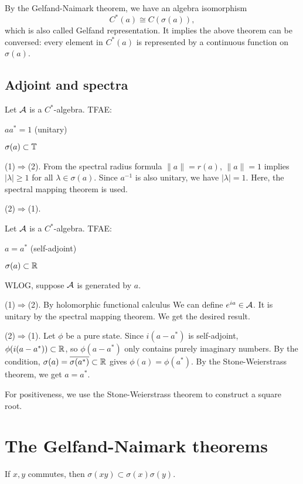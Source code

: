 \documentclass{../crs}
\begin{document}
By the Gelfand-Naimark theorem, we have an algebra isomorphism
\[C^*(a)\cong C(\sigma(a)),\]
which is also called Gelfand representation.
It implies the above theorem can be conversed: every element in $C^*(a)$ is represented by a continuous function on $\sigma(a)$.




\subsection{Adjoint and spectra}
\begin{thm}
Let $\mathcal{A}$ is a $C^*$-algebra.
TFAE:
\begin{cond}
\item $aa^*=1$ (unitary)
\item $\sigma(a)\subset\mathbb{T}$
\end{cond}
\end{thm}
\begin{pf}
(1)$\Rightarrow$(2).
From the spectral radius formula $\|a\|=r(a)$, $\|a\|=1$ implies $|\lambda|\ge1$ for all $\lambda\in\sigma(a)$.
Since $a^{-1}$ is also unitary, we have $|\lambda|=1$.
Here, the spectral mapping theorem is used.

(2)$\Rightarrow$(1).
\end{pf}

\begin{thm}
Let $\mathcal{A}$ is a $C^*$-algebra.
TFAE:
\begin{cond}
\item $a=a^*$ (self-adjoint)
\item $\sigma(a)\subset\mathbb{R}$
\end{cond}
\end{thm}
\begin{pf}
WLOG, suppose $\mathcal{A}$ is generated by $a$.

(1)$\Rightarrow$(2).
By holomorphic functional calculus We can define $e^{ia}\in\mathcal{A}$.
It is unitary by the spectral mapping theorem.
We get the desired result.

(2)$\Rightarrow$(1).
Let $\phi$ be a pure state.
Since $i(a-a^*)$ is self-adjoint, $\phi(i(a-a^*))\subset\mathbb{R}$, so $\phi(a-a^*)$ only contains purely imaginary numbers.
By the condition, $\sigma(a)=\overline{\sigma(a^*)}\subset\mathbb{R}$ gives $\phi(a)=\phi(a^*)$.
By the Stone-Weierstrass theorem, we get $a=a^*$.
\end{pf}

For positiveness, we use the Stone-Weierstrass theorem to construct a square root.


\section{The Gelfand-Naimark theorems}
\begin{thm}
If $x,y$ commutes, then $\sigma(xy)\subset\sigma(x)\sigma(y)$.
\end{thm}
\end{document}
